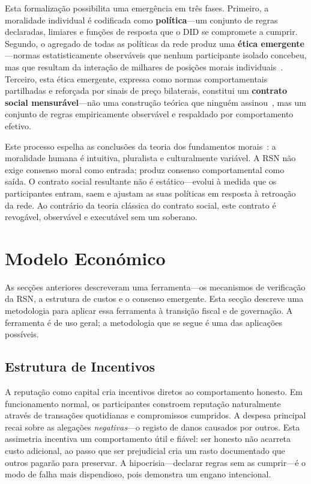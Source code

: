 \documentclass[11pt,a4paper,twocolumn]{article}
\begin{document}
Esta formalização possibilita uma emergência em três fases. Primeiro, a moralidade individual é codificada como \textbf{política}---um conjunto de regras declaradas, limiares e funções de resposta que o DID se compromete a cumprir. Segundo, o agregado de todas as políticas da rede produz uma \textbf{ética emergente}---normas estatisticamente observáveis que nenhum participante isolado concebeu, mas que resultam da interação de milhares de posições morais individuais~\cite{durkheim1893}. Terceiro, esta ética emergente, expressa como normas comportamentais partilhadas e reforçada por sinais de preço bilaterais, constitui um \textbf{contrato social mensurável}---não uma construção teórica que ninguém assinou~\cite{rawls1971}, mas um conjunto de regras empiricamente observável e respaldado por comportamento efetivo.

Este processo espelha as conclusões da teoria dos fundamentos morais~\cite{haidt2012}: a moralidade humana é intuitiva, pluralista e culturalmente variável. A RSN não exige consenso moral como entrada; produz consenso comportamental como saída. O contrato social resultante não é estático---evolui à medida que os participantes entram, saem e ajustam as suas políticas em resposta à retroação da rede. Ao contrário da teoria clássica do contrato social, este contrato é revogável, observável e executável sem um soberano.

\section{Modelo Económico}

As secções anteriores descreveram uma ferramenta---os mecanismos de verificação da RSN, a estrutura de custos e o consenso emergente. Esta secção descreve uma metodologia para aplicar essa ferramenta à transição fiscal e de governação. A ferramenta é de uso geral; a metodologia que se segue é uma das aplicações possíveis.

\subsection{Estrutura de Incentivos}

A reputação como capital cria incentivos diretos ao comportamento honesto. Em funcionamento normal, os participantes constroem reputação naturalmente através de transações quotidianas e compromissos cumpridos. A despesa principal recai sobre as alegações \emph{negativas}---o registo de danos causados por outros. Esta assimetria incentiva um comportamento útil e fiável: ser honesto não acarreta custo adicional, ao passo que ser prejudicial cria um rasto documentado que outros pagarão para preservar. A hipocrisia---declarar regras sem as cumprir---é o modo de falha mais dispendioso, pois demonstra um engano intencional.
\end{document}
